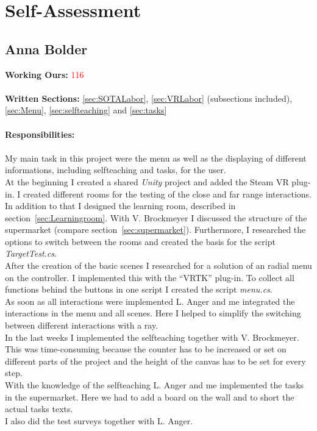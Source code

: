 \section{Self-Assessment} \label{sec:SA}


\subsection{Anna Bolder} \label{sec:SAAnna}

\textbf{Working Ours:} \textcolor{red}{116} \\ \\
\textbf{Written Sections:} \ref{sec:SOTALabor},  \ref{sec:VRLabor} (subsections included), \ref{sec:Menu}, \ref{sec:selfteaching} and \ref{sec:tasks} \\ \\
\textbf{Responsibilities:}\\ \\
My main task in this project were the menu as well as the displaying of different informations, including selfteaching and tasks, for the user. \\
At the beginning I created a shared \textit{Unity} project and added the Steam VR plug-in. I created different rooms for the testing of the close and far range interactions. In addition to that I designed the learning room, described in section~\ref{sec:Learningroom}. With V. Brockmeyer I discussed the structure of the supermarket (compare section~\ref{sec:supermarket}). Furthermore, I researched the options to switch between the rooms and created the basis for the script \textit{TargetTest.cs}.\\
After the creation of the basic scenes I researched for a solution of an radial menu on the controller. I implemented this with the ``VRTK'' plug-in. To collect all functions behind the buttons in one script I created the script \textit{menu.cs}.\\
As soon as all interactions were implemented L. Anger and me integrated the interactions in the menu and all scenes. Here I helped to simplify the switching between different interactions with a ray. \\
In the last weeks I implemented the selfteaching together with V. Brockmeyer. This was time-consuming because the counter has to be increased or set on different parts of the project and the height of the canvas has to be set for every step.\\
With the knowledge of the selfteaching L. Anger and me implemented the tasks in the supermarket. Here we had to add a board on the wall and to short the actual tasks texts. \\
I also did the test surveys together with L. Anger.\\

